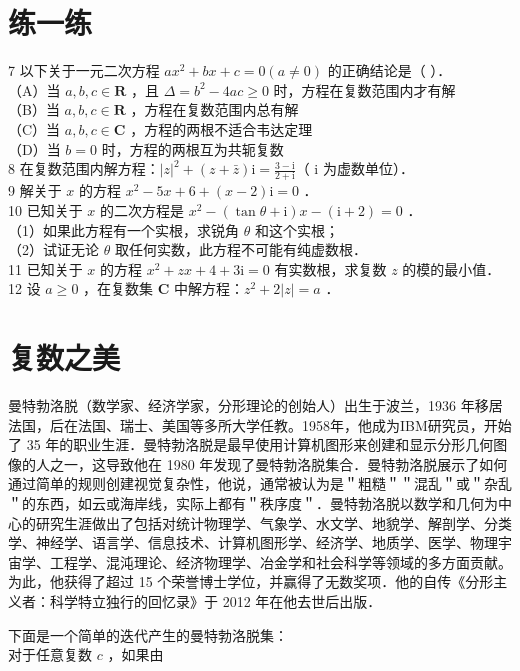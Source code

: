 \documentclass[10pt]{article}
\begin{document}
\section*{练一练}
7 以下关于一元二次方程 \(a x^{2}+b x+c=0(a \neq 0)\) 的正确结论是（ ）．\\
（A）当 \(a, b, c \in \mathbf{R}\) ，且 \(\Delta=b^{2}-4 a c \geqslant 0\) 时，方程在复数范围内才有解\\
（B）当 \(a, b, c \in \mathbf{R}\) ，方程在复数范围内总有解\\
（C）当 \(a, b, c \in \mathbf{C}\) ，方程的两根不适合韦达定理\\
（D）当 \(b=0\) 时，方程的两根互为共轭复数\\
8 在复数范围内解方程：\(|z|^{2}+(z+\bar{z}) \mathrm{i}=\frac{3-\mathrm{i}}{2+\mathrm{i}}\)（ i 为虚数单位）．\\
9 解关于 \(x\) 的方程 \(x^{2}-5 x+6+(x-2) \mathrm{i}=0\) ．\\
10 已知关于 \(x\) 的二次方程是 \(x^{2}-(\tan \theta+\mathrm{i}) x-(\mathrm{i}+2)=0\) ．\\
（1）如果此方程有一个实根，求锐角 \(\theta\) 和这个实根；\\
（2）试证无论 \(\theta\) 取任何实数，此方程不可能有纯虚数根．\\
11 已知关于 \(x\) 的方程 \(x^{2}+z x+4+3 \mathrm{i}=0\) 有实数根，求复数 \(z\) 的模的最小值．\\
12 设 \(a \geqslant 0\) ，在复数集 \(\mathbf{C}\) 中解方程：\(z^{2}+2|z|=a\) ．

\section*{复数之美}
曼特勃洛脱（数学家、经济学家，分形理论的创始人）出生于波兰，1936 年移居法国，后在法国、瑞士、美国等多所大学任教。1958年，他成为IBM研究员，开始了 35 年的职业生涯．曼特勃洛脱是最早使用计算机图形来创建和显示分形几何图像的人之一，这导致他在 1980 年发现了曼特勃洛脱集合．曼特勃洛脱展示了如何通过简单的规则创建视觉复杂性，他说，通常被认为是＂粗糙＂＂混乱＂或＂杂乱＂的东西，如云或海岸线，实际上都有＂秩序度＂．曼特勃洛脱以数学和几何为中心的研究生涯做出了包括对统计物理学、气象学、水文学、地貌学、解剖学、分类学、神经学、语言学、信息技术、计算机图形学、经济学、地质学、医学、物理宇宙学、工程学、混沌理论、经济物理学、冶金学和社会科学等领域的多方面贡献。为此，他获得了超过 15 个荣誉博士学位，并赢得了无数奖项．他的自传《分形主义者：科学特立独行的回忆录》于 2012 年在他去世后出版．

下面是一个简单的迭代产生的曼特勃洛脱集：\\
对于任意复数 \(c\) ，如果由
\end{document}
